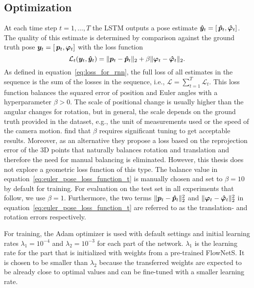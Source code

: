 		\subsection{Optimization}
			At each time step $t = 1, \dots, T$ the LSTM outputs a pose estimate 
			$\bm{\hat{y}}_t = \left[ \, \bm{\hat{p}}_t,  \bm{\hat{\varphi}}_t \right]$.
			The quality of this estimate is determined by comparison against the ground truth pose 
			$\bm{y}_t = \left[ \, \bm{p}_t,  \bm{\varphi}_t \right]$
			with the loss function
			\begin{equation}\label{eq:euler_pose_loss_function_t}
				\mathcal{L}_t(\bm{y}_t, \bm{\hat{y}}_t) = 
					\lVert \bm{p}_t - \bm{\hat{p}}_t \rVert_2 + 
					\beta \lVert \bm{\varphi}_t - \bm{\hat{\varphi}}_t \rVert_2.
			\end{equation}
			As defined in equation~\ref{eq:loss_for_rnn}, the full loss of all estimates in the sequence is the sum of the losses in the sequence, i.e., 
			$\mathcal{L} = \sum_{t = 1}^{T} \mathcal{L}_t$.
			This loss function balances the squared error of position and Euler angles with a hyperparameter $\beta > 0$.
			The scale of positional change is usually higher than the angular changes for rotation, but in general, the scale depends on the ground truth provided in the dataset, e.g., the unit of measurements used or the speed of the camera motion.
			\cite{kendall2017geometric} find that $\beta$ requires significant tuning to get acceptable results.
			Moreover, as an alternative they propose a loss based on the reprojection error of the 3D points that naturally balances rotation and translation and therefore the need for manual balancing is eliminated.
			However, this thesis does not explore a geometric loss function of this type.
			The balance value in equation~\ref{eq:euler_pose_loss_function_t} is manually chosen and set to $\beta = 10$ by default for training.
			For evaluation on the test set in all experiments that follow, we use $\beta = 1$.
			Furthermore, the two terms 
			$\lVert \bm{p}_t - \bm{\hat{p}}_t \rVert_2^2$ and 
			$\lVert \bm{\varphi}_t - \bm{\hat{\varphi}}_t \rVert_2^2$
			in equation~\ref{eq:euler_pose_loss_function_t} are referred to as the translation- and rotation errors respectively.
			
			
			For training, the Adam optimizer is used with default settings and initial learning rates $\lambda_1 = 10^{-4}$ and $\lambda_2 = 10^{-3}$ for each part of the network.
			$\lambda_1$ is the learning rate for the part that is initialized with weights from a pre-trained FlowNetS.
			It is chosen to be smaller than $\lambda_2$ because the transferred weights are expected to be already close to optimal values and can be fine-tuned with a smaller learning rate.
			
